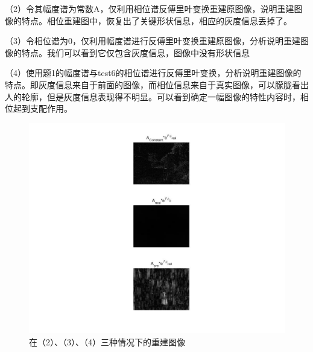 \documentclass[UTF8]{article} %
\begin{document}
	
	（2）令其幅度谱为常数A，仅利用相位谱反傅里叶变换重建原图像，说明重建图像的特点。相位重建图中，恢复出了关键形状信息，相应的灰度信息丢掉了。
	
	（3）令相位谱为0，仅利用幅度谱进行反傅里叶变换重建原图像，分析说明重建图像的特点。我们可以看到它仅包含灰度信息，图像中没有形状信息
	
	（4）使用题1的幅度谱与test6的相位谱进行反傅里叶变换，分析说明重建图像的特点。即灰度信息来自于前面的图像，而相位信息来自于真实图像，可以朦胧看出人的轮廓，但是灰度信息表现得不明显。可以看到确定一幅图像的特性内容时，相位起到支配作用。
	\begin{figure}[H]
		\centering
		\includegraphics[width=0.7\linewidth]{2-6}
		\caption{在（2）、（3）、（4）三种情况下的重建图像}
		\label{fig:2-6}
	\end{figure}
	
\end{document}
